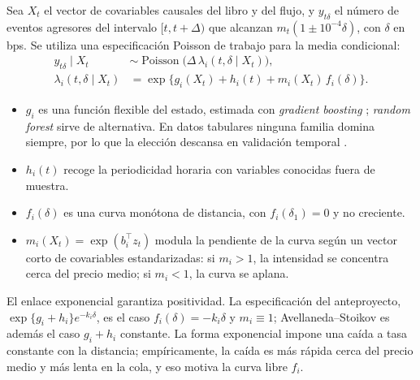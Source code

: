 Sea $X_t$ el vector de covariables causales del libro y del flujo, y $y_{t\delta}$ el número de eventos agresores del intervalo $[t,t+\Delta)$ que alcanzan $m_t(1\pm10^{-4}\delta)$, con $\delta$ en bps. Se utiliza una especificación Poisson de trabajo para la media condicional:
\begin{equation}
\begin{aligned}
 y_{t\delta}\mid X_t&\sim\operatorname{Poisson}\bigl(\Delta\,\lambda_i(t,\delta\mid X_t)\bigr),\\
 \lambda_i(t,\delta\mid X_t)&=\exp\bigl\{g_i(X_t)+h_i(t)+m_i(X_t)\,f_i(\delta)\bigr\}.
\end{aligned}
 \label{eq:fkx}
\end{equation}
\begin{itemize}[nosep]
\item $g_i$ es una función flexible del estado, estimada con \textit{gradient boosting} \citep{Friedman2001}; \textit{random forest} \citep{Breiman2001} sirve de alternativa. En datos tabulares ninguna familia domina siempre, por lo que la elección descansa en validación temporal \citep{GrinsztajnEtAl2022}.
\item $h_i(t)$ recoge la periodicidad horaria con variables conocidas fuera de muestra.
\item $f_i(\delta)$ es una curva monótona de distancia, con $f_i(\delta_1)=0$ y no creciente.
\item $m_i(X_t)=\exp(b_i^\top z_t)$ modula la pendiente de la curva según un vector corto de covariables estandarizadas: si $m_i>1$, la intensidad se concentra cerca del precio medio; si $m_i<1$, la curva se aplana.
\end{itemize}
El enlace exponencial garantiza positividad. La especificación del anteproyecto, $\exp\{g_i+h_i\}e^{-k_i\delta}$, es el caso $f_i(\delta)=-k_i\delta$ y $m_i\equiv1$; Avellaneda--Stoikov es además el caso $g_i+h_i$ constante. La forma exponencial impone una caída a tasa constante con la distancia; empíricamente, la caída es más rápida cerca del precio medio y más lenta en la cola, y eso motiva la curva libre $f_i$.

